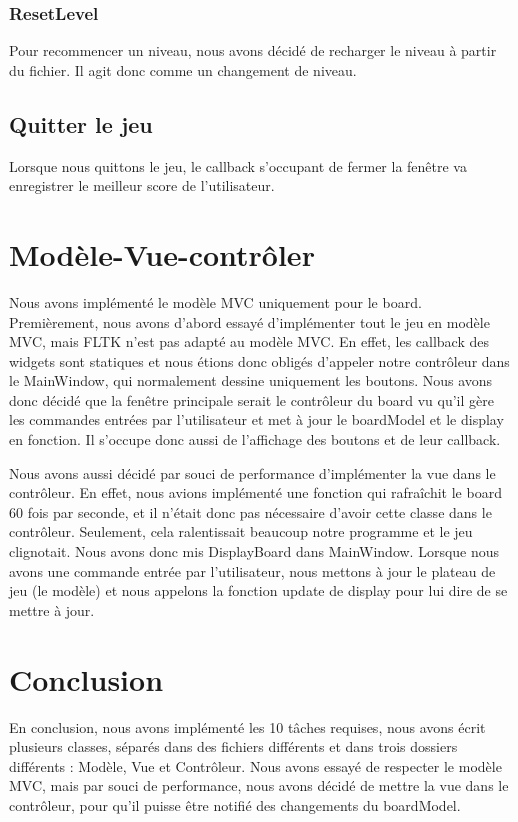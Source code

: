 \documentclass[utf8]{article}
\begin{document}
\begin{large}
\subsubsection{ResetLevel}
\indent
\par
Pour recommencer un niveau, nous avons décidé de recharger le niveau à partir du
fichier. Il agit donc comme un changement de niveau.
\subsection{Quitter le jeu}
\indent
\par
Lorsque nous quittons le jeu, le callback s'occupant de fermer la fenêtre va
enregistrer le meilleur score de l'utilisateur.
\par

\section{Modèle-Vue-contrôler}
\indent
\par
Nous avons implémenté le modèle MVC uniquement pour le board. Premièrement, nous
avons d'abord essayé d'implémenter tout le jeu en modèle MVC, mais FLTK n'est
pas adapté au modèle MVC. En effet, les callback des widgets sont statiques et
nous étions donc obligés d'appeler notre contrôleur dans le MainWindow, qui
normalement dessine uniquement les boutons. Nous avons donc décidé que la
fenêtre principale serait le contrôleur du board vu qu'il gère les commandes
entrées par l'utilisateur et met à jour le boardModel et le display en fonction.
Il s'occupe donc aussi de l'affichage des boutons et de leur callback.
\par
Nous avons aussi décidé par souci de performance d'implémenter la vue dans le
contrôleur. En effet, nous avions implémenté une fonction qui rafraîchit le
board 60 fois par seconde, et il n'était donc pas nécessaire d'avoir cette
classe dans le contrôleur. Seulement, cela ralentissait beaucoup notre programme
et le jeu clignotait. Nous avons donc mis DisplayBoard dans MainWindow. Lorsque
nous avons une commande entrée par l'utilisateur, nous mettons à jour le plateau
de jeu (le modèle) et nous appelons la fonction update de display pour
lui dire de se mettre à jour. 
\par
\section{Conclusion}
\indent
\par
En conclusion, nous avons implémenté les 10 tâches requises, nous avons écrit
plusieurs classes, séparés dans des fichiers différents et dans trois dossiers
différents : Modèle, Vue et Contrôleur. Nous avons essayé de respecter le modèle
MVC, mais par souci de performance, nous avons décidé de mettre la vue dans le
contrôleur, pour qu'il puisse être notifié des changements du boardModel.
\par

\end{large}
\end{document}
